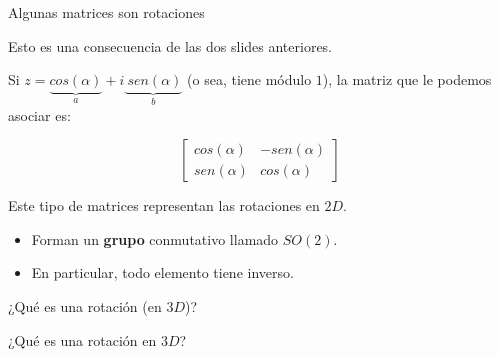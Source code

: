 \documentclass[10pt]{beamer}
\def\R{\mathbb{R}}
\begin{document}
\begin{frame}{Algunas matrices son rotaciones}

Esto es una consecuencia de las dos slides anteriores.

Si $z =  \underbrace{cos(\alpha)}_{a} + i \underbrace{\ sen(\alpha)}_{b}$ (o sea, tiene módulo $1$), la matriz que le podemos asociar es:

\[
\begin{bmatrix}
    cos(\alpha)  &  -sen(\alpha)      \\
    sen(\alpha)  &  cos(\alpha)      
\end{bmatrix}
\] 

Este tipo de matrices representan las rotaciones en $2D$.

\begin{itemize}
	\item Forman un \textbf{grupo} conmutativo llamado $SO(2)$.
	\item En particular, todo elemento tiene inverso. %
	
\end{itemize}




\end{frame}

\fi


\begin{frame}{¿Qué es una rotación (en $3D$)?}

	\Huge ¿Qué es una rotación en $3D$?



	
\end{frame}
\end{document}
